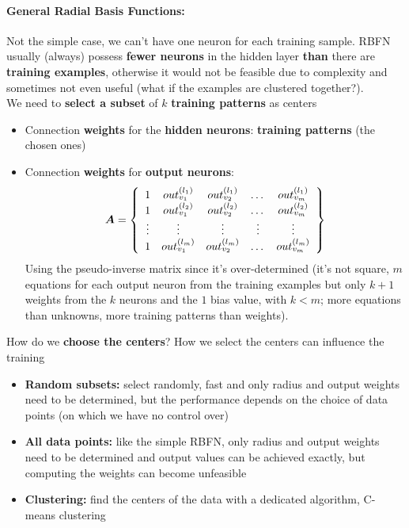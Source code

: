 \documentclass[11pt]{article}
\begin{document}
		\newpage
		
		\paragraph{General Radial Basis Functions:} Not the simple case, we can't have one neuron for each training sample. RBFN usually (always) possess \textbf{fewer neurons} in the hidden layer \textbf{than} there are \textbf{training examples}, otherwise it would not be feasible due to complexity and sometimes not even useful (what if the examples are clustered together?).\\
		
		We need to \textbf{select a subset} of $k$ \textbf{training patterns} as centers
		\begin{itemize}
			\item Connection \textbf{weights} for the \textbf{hidden neurons}: \textbf{training patterns} (the chosen ones)
			\item Connection \textbf{weights} for \textbf{output neurons}:
			$$ \bm{A} = \left\{
			\begin{array}{c c c c c}
				1 & out_{v_1}^{(l_1)} & out_{v_2}^{(l_1)} & \dots & out_{v_m}^{(l_1)} \\
				1 & out_{v_1}^{(l_2)} & out_{v_2}^{(l_2)} & \dots & out_{v_m}^{(l_2)} \\
				\vdots & \vdots & \vdots & \vdots & \vdots \\
				1 & out_{v_1}^{(l_m)} & out_{v_2}^{(l_m)} & \dots & out_{v_m}^{(l_m)} \\
			\end{array}
			\right\}$$
			Using the pseudo-inverse matrix since it's over-determined (it's not square, $m$ equations for each output neuron from the training examples but only $k+1$ weights from the $k$ neurons and the $1$ bias value, with $k < m$; more equations than unknowns, more training patterns than weights).
		\end{itemize}
		
		How do we \textbf{choose the centers}? How we select the centers can influence the training
		\begin{itemize}
			\item \textbf{Random subsets:} select randomly, fast and only radius and output weights need to be determined, but the performance depends on the choice of data points (on which we have no control over)
			\item \textbf{All data points:} like the simple RBFN, only radius and output weights need to be determined and output values can be achieved exactly, but computing the weights can become unfeasible 
			\item \textbf{Clustering:} find the centers of the data with a dedicated algorithm, C-means clustering
		\end{itemize}
		
\end{document}
